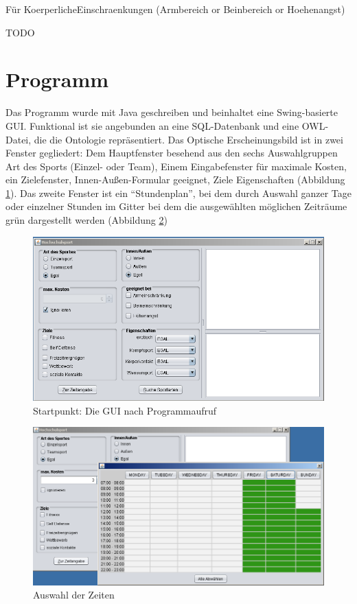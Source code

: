 Für KoerperlicheEinschraenkungen
(Armbereich or Beinbereich or Hoehenangst)

TODO

\section{Programm}
Das Programm wurde mit Java geschreiben und beinhaltet eine Swing-basierte GUI. Funktional ist sie angebunden an eine SQL-Datenbank und eine OWL-Datei, die die Ontologie repräsentiert. Das Optische Erscheinungsbild ist in zwei Fenster gegliedert: Dem Hauptfenster besehend aus den sechs Auswahlgruppen Art des Sports (Einzel- oder Team), Einem Eingabefenster für maximale Kosten, ein Zielefenster, Innen-Außen-Formular geeignet, Ziele Eigenschaften (Abbildung \ref{GUI1}). Das zweite Fenster ist ein "`Stundenplan"', bei dem durch Auswahl ganzer Tage oder einzelner Stunden im Gitter bei dem die ausgewählten möglichen Zeiträume grün dargestellt werden (Abbildung \ref{GUI2})

\begin{figure}%
\includegraphics[width=150mm]{images/gui.png}%
\caption{Startpunkt: Die GUI nach Programmaufruf}%
\label{GUI1}%
\end{figure}

\begin{figure}%
\includegraphics[width=150mm]{images/guizeit.png}%
\caption{Auswahl der Zeiten}%
\label{GUI2}%
\end{figure}

